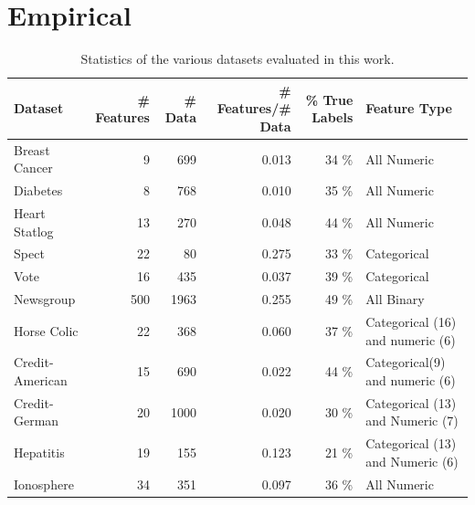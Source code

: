 \section{Empirical}

\begin{table}[tbp!]
\centering
\begin{tabular}{|l|r|r|r|r|l|} \hline
Dataset & \# Features & \# Data & \# Features/\# Data & \% True Labels & Feature Type\\ \hline \hline 
Breast Cancer	& 9	& 699	& 0.013	& 34 \%	& All Numeric\\ \hline
Diabetes        & 8	& 768	& 0.010	& 35 \%	& All Numeric\\ \hline
Heart Statlog	& 13	& 270	& 0.048	& 44 \%	& All Numeric\\ \hline
Spect	        & 22	& 80	& 0.275 & 33 \%	& Categorical\\ \hline
Vote	        & 16	& 435	& 0.037	& 39 \%	& Categorical\\ \hline
Newsgroup	& 500	& 1963	& 0.255	& 49 \%	& All Binary\\ \hline
Horse Colic	& 22	& 368	& 0.060	& 37 \%	& Categorical (16) and numeric (6)\\ \hline
Credit-American	& 15	& 690	& 0.022	& 44 \%	& Categorical(9) and numeric (6)\\ \hline
Credit-German	& 20	& 1000	& 0.020 & 30 \%	& Categorical (13) and Numeric (7)\\ \hline
Hepatitis	& 19	& 155	& 0.123	& 21 \%	& Categorical (13) and Numeric (6)\\ \hline
Ionosphere	& 34	& 351	& 0.097	& 36 \%	& All Numeric\\ \hline
\end{tabular}
\caption{\footnotesize Statistics of the various datasets evaluated in this work.}
\label{table:stats}
\end{table}

